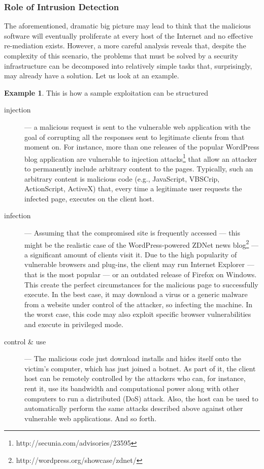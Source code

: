 \documentclass[12pt]{article}
\theoremstyle{definition}
\newtheorem{example}{Example}[section]
\begin{document}
		\subsubsection{Role of Intrusion Detection}
		
		The aforementioned, dramatic big picture may lead to think that the malicious software will eventually proliferate at every host of the Internet and no effective re-mediation exists. However, a more careful analysis reveals that, despite the complexity of this scenario, the problems that must be solved by a security infrastructure can be decomposed into relatively simple tasks that, surprisingly, may already have a solution\cite{Gupta2016}. Let us look at an example.
			
		\begin{example}
				This is how a sample exploitation can be structured
				\begin{description}
					\item [injection] --- a malicious request is sent to the vulnerable
					web application with the goal of corrupting all the responses sent
					to legitimate clients from that moment on. For instance, more than
					one releases of the popular \textsf{WordPress} blog application are
					vulnerable to injection
					attacks\footnote{http://secunia.com/advisories/23595} that allow an
					attacker to permanently include arbitrary content to the
					pages. Typically, such an arbitrary content is malicious code (e.g.,
					JavaScript, VBSCrip, ActionScript, ActiveX) that, every time a
					legitimate user requests the infected page, executes on the client
					host.
					\item [infection] --- Assuming that the compromised site is
					frequently accessed --- this might be the realistic case of the
					\textsf{WordPress}-powered \textsf{ZDNet} news
					blog\footnote{http://wordpress.org/showcase/zdnet/} --- a
					significant amount of clients visit it. Due to the high popularity
					of vulnerable browsers and plug-ins, the client may run
					\textsf{Internet Explorer} --- that is the most popular --- or an
					outdated release of \textsf{Firefox} on \textsf{Windows}. This
					create the perfect circumstances for the malicious page to
					successfully execute. In the best case, it may download a virus or a
					generic malware from a website under control of the attacker, so
					infecting the machine. In the worst case, this code may also exploit
					specific browser vulnerabilities and execute in privileged mode.
					\item [control \& use] --- The malicious code just download installs
					and hides itself onto the victim's computer, which has just joined a
					botnet. As part of it, the client host can be remotely controlled by
					the attackers who can, for instance, rent it, use its bandwidth and
					computational power along with other computers to run a distributed
					(DoS) attack\cite{Raman2017}. Also, the host can be used to automatically perform
					the same attacks described above against other vulnerable web
					applications. And so forth.
				\end{description}
			\end{example}
		
\end{document}
